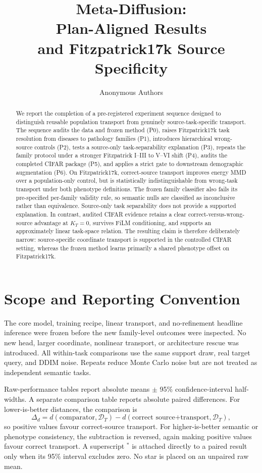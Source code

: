 \documentclass{article}
\title{Meta-Diffusion:\\
Plan-Aligned Results\\
and Fitzpatrick17k Source Specificity}
\author{Anonymous Authors}
\newcommand{\KT}{K_T}
\newcommand{\sigstar}{^{*}}
\begin{document}
\maketitle

\begin{abstract}
We report the completion of a pre-registered experiment sequence designed to distinguish
reusable population transport from genuinely source-task-specific transport.  The sequence
audits the data and frozen method (P0), raises Fitzpatrick17k task resolution from diseases to
pathology families (P1), introduces hierarchical wrong-source controls (P2), tests a
source-only task-separability explanation (P3), repeats the family protocol under a stronger
Fitzpatrick I--III to V--VI shift (P4), audits the completed CIFAR package (P5), and applies a
strict gate to downstream demographic augmentation (P6).  On Fitzpatrick17k, correct-source
transport improves energy MMD over a population-only control, but is statistically
indistinguishable from wrong-task transport under both phenotype definitions.  The frozen
family classifier also fails its pre-specified per-family validity rule, so semantic nulls are
classified as inconclusive rather than equivalence.  Source-only task separability does not
provide a supported explanation.  In contrast, audited CIFAR evidence retains a clear
correct-versus-wrong-source advantage at $\KT=0$, survives FiLM conditioning, and supports an
approximately linear task-space relation.  The resulting claim is therefore deliberately
narrow: source-specific coordinate transport is supported in the controlled CIFAR setting,
whereas the frozen method learns primarily a shared phenotype offset on Fitzpatrick17k.
\end{abstract}

\section{Scope and Reporting Convention}

The core model, training recipe, linear transport, and no-refinement headline inference were
frozen before the new family-level outcomes were inspected.  No new head, larger coordinate,
nonlinear transport, or architecture rescue was introduced.  All within-task comparisons use
the same support draw, real target query, and DDIM noise.  Repeats reduce Monte Carlo noise but
are not treated as independent semantic tasks.

Raw-performance tables report absolute means $\pm$ 95\% confidence-interval half-widths.  A
separate comparison table reports absolute paired differences.  For lower-is-better
distances, the comparison is
\begin{equation}
  \Delta_d=d(\text{comparator},\mathcal D_T)
          -d(\text{correct source+transport},\mathcal D_T),
\end{equation}
so positive values favour correct-source transport.  For higher-is-better semantic or
phenotype consistency, the subtraction is reversed, again making positive values favour
correct transport.  A superscript $\sigstar$ is attached directly to a paired result only
when its 95\% interval excludes zero.  No star is placed on an unpaired raw mean.
\end{document}
